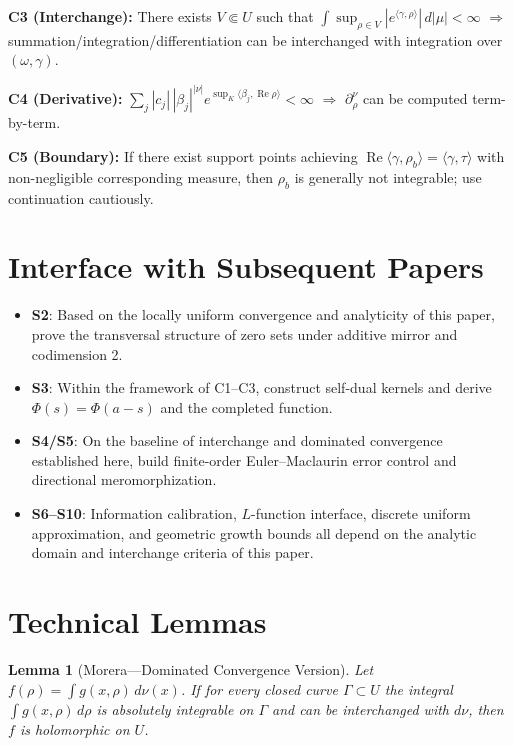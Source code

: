 \documentclass[11pt,a4paper]{article}
\newtheorem{lemma}[theorem]{Lemma}
\theoremstyle{remark}
\DeclareMathOperator{\Re}{Re}
\begin{document}
\textbf{C3 (Interchange):} There exists $V\Subset U$ such that $\int \sup_{\rho\in V}|e^{\langle\gamma,\rho\rangle}|\,d|\mu|<\infty$ $\Rightarrow$ summation/integration/differentiation can be interchanged with integration over $(\omega,\gamma)$.

\textbf{C4 (Derivative):} $\sum_j|c_j|\,|\beta_j|^{|\nu|}e^{\sup_{K}\langle\beta_j,\Re\rho\rangle}<\infty$ $\Rightarrow$ $\partial_\rho^\nu$ can be computed term-by-term.

\textbf{C5 (Boundary):} If there exist support points achieving $\Re\langle\gamma,\rho_b\rangle=\langle\gamma,\tau\rangle$ with non-negligible corresponding measure, then $\rho_b$ is generally not integrable; use continuation cautiously.

\section{Interface with Subsequent Papers}

\begin{itemize}
\item \textbf{S2}: Based on the locally uniform convergence and analyticity of this paper, prove the transversal structure of zero sets under additive mirror and codimension 2.
\item \textbf{S3}: Within the framework of C1--C3, construct self-dual kernels and derive $\Phi(s)=\Phi(a-s)$ and the completed function.
\item \textbf{S4/S5}: On the baseline of interchange and dominated convergence established here, build finite-order Euler--Maclaurin error control and directional meromorphization.
\item \textbf{S6--S10}: Information calibration, $L$-function interface, discrete uniform approximation, and geometric growth bounds all depend on the analytic domain and interchange criteria of this paper.
\end{itemize}

\appendix

\section{Technical Lemmas}

\begin{lemma}[Morera---Dominated Convergence Version]\label{lem:morera}
Let $f(\rho)=\int g(x,\rho)\,d\nu(x)$. If for every closed curve $\Gamma\subset U$ the integral $\int g(x,\rho)\,d\rho$ is absolutely integrable on $\Gamma$ and can be interchanged with $d\nu$, then $f$ is holomorphic on $U$.
\end{lemma}
\end{document}
